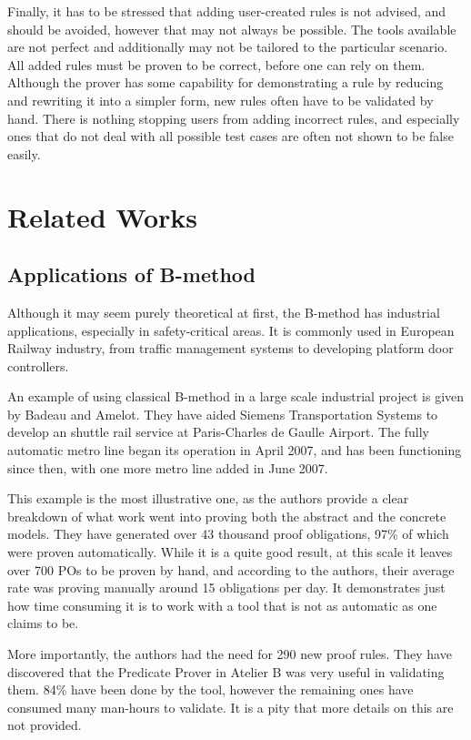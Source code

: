 \documentclass[11pt,journal]{IEEEtran}
\begin{document}
	Finally, it has to be stressed that adding user-created rules is not advised, and should be avoided, however that may not always be possible. The tools available are not perfect and additionally may not be tailored to the particular scenario. All added rules must be proven to be correct, before one can rely on them. Although the prover has some capability for demonstrating a rule by reducing and rewriting it into a simpler form, new rules often have to be validated by hand. There is nothing stopping users from adding incorrect rules, and especially ones that do not deal with all possible test cases are often not shown to be false easily.
	
	\section{Related Works}
	
	\subsection{Applications of B-method}
	Although it may seem purely theoretical at first, the B-method has industrial applications, especially in safety-critical areas. It is commonly used in European Railway industry, from traffic management systems to developing platform door controllers\cite{Door controller}.
	
	An example of using classical B-method in a large scale industrial project is given by Badeau and Amelot\cite{airport shuttle}. They have aided Siemens Transportation Systems to develop an shuttle rail service at Paris-Charles de Gaulle Airport. The fully automatic metro line began its operation in April 2007, and has been functioning since then, with one more metro line added in June 2007.
	
	This example is the most illustrative one, as the authors provide a clear breakdown of what work went into proving both the abstract and the concrete models. They have generated over 43 thousand proof obligations, 97\% of which were proven automatically. While it is a quite good result, at this scale it leaves over 700 POs to be proven by hand, and according to the authors, their average rate was proving manually around 15 obligations per day. It demonstrates just how time consuming it is to work with a tool that is not as automatic as one claims to be.
	
	More importantly, the authors had the need for 290 new proof rules. They have discovered that the Predicate Prover in Atelier B was very useful in validating them. 84\% have been done by the tool, however the remaining ones have consumed many man-hours to validate. It is a pity that more details on this are not provided.
	
\end{document}
